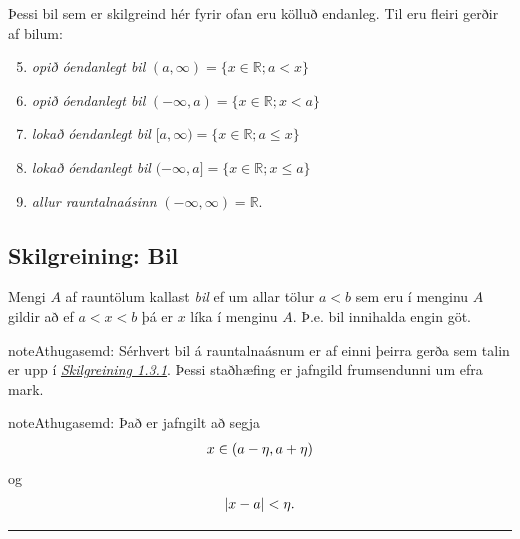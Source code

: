 \documentclass[a4paper,10pt,icelandic]{sphinxmanual}
\begin{document}
Þessi bil sem er skilgreind hér fyrir ofan eru kölluð endanleg. Til eru
fleiri gerðir af bilum:
\begin{enumerate}
\setcounter{enumi}{4}
\item {} 
\emph{opið óendanlegt bil} \((a,\infty)=\{x\in \mathbb{R}; a<x\}\)

\item {} 
\emph{opið óendanlegt bil} \((-\infty, a)=\{x\in \mathbb{R}; x<a\}\)

\item {} 
\emph{lokað óendanlegt bil} \([a,\infty)=\{x\in \mathbb{R}; a\leq x\}\)

\item {} 
\emph{lokað óendanlegt bil} \((-\infty, a]=\{x\in \mathbb{R}; x\leq a\}\)

\item {} 
\emph{allur rauntalnaásinn} \((-\infty, \infty)= \mathbb{R}\).

\end{enumerate}


\subsection{Skilgreining: Bil}
\label{kafli01:id1}
Mengi \(A\) af rauntölum kallast \textit{bil} ef um allar
tölur \(a<b\) sem eru í menginu \(A\) gildir að ef \(a<x<b\)
þá er \(x\) líka í menginu \(A\). Þ.e. bil innihalda engin göt.

\begin{notice}{note}{Athugasemd:}
Sérhvert bil á rauntalnaásnum er af einni þeirra gerða sem talin er
upp í {\hyperref[kafli01:skilgreining\string-1\string-3\string-1]{\emph{Skilgreining 1.3.1}}}. Þessi staðhæfing er jafngild frumsendunni um
efra mark.
\end{notice}

\begin{notice}{note}{Athugasemd:}
Það er jafngilt að segja
\begin{gather}
\begin{split}x \in (a-\eta,a+\eta)\end{split}\notag
\end{gather}
og
\begin{gather}
\begin{split}|x-a| < \eta.\end{split}\notag
\end{gather}\end{notice}


\bigskip\hrule{}\bigskip
\end{document}
